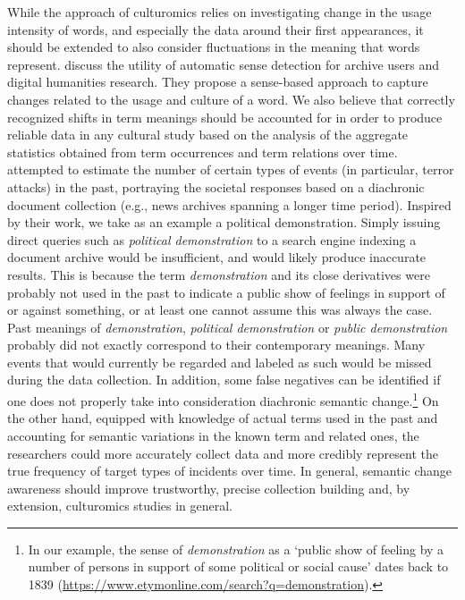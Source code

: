 \documentclass[output=paper%
]{langsci/langscibook}
\begin{document}
While the approach of culturomics relies on investigating change in the usage intensity of words, and especially the data around their first appearances, it should be extended to also consider fluctuations in the meaning that words represent. \citet{tahmasebi2017uses} discuss the utility of automatic sense detection for archive users and  digital humanities research. They propose a sense-based approach to capture changes related to the usage and culture of a word. We also believe that correctly recognized shifts in term meanings should be accounted for in order to produce reliable data in any cultural study based on the analysis of the aggregate statistics obtained from term occurrences and term relations over time. \citet{dblp:conf/histoinfo/fridlundobb19} attempted to estimate the number of certain types of events (in particular, terror attacks) in the past,  portraying the societal responses based on a diachronic document collection (e.g., news archives spanning a longer time period). Inspired by their work, we take as an example a political demonstration.
Simply issuing direct queries such as \emph{political demonstration} to a search engine indexing a document archive would be insufficient, and would likely produce inaccurate results. This is because the term \emph{demonstration} and its close derivatives were probably not used in the past to indicate a public show of feelings in support of or against something, or at least one cannot assume this was always the case. Past meanings of \emph{demonstration}, \emph{political demonstration} or \emph{public demonstration} probably did not exactly correspond to their contemporary meanings. Many events that would currently be regarded and labeled as such would  be missed during the data collection. In addition, some false negatives can  be identified if one does not properly take into consideration diachronic semantic change.\footnote{In our example, the sense of \emph{demonstration} as a `public show of feeling by a number of persons in support of some political or social cause' dates back to 1839 (\url{https://www.etymonline.com/search?q=demonstration}).} On the other hand, equipped with  knowledge of actual terms used in the past and accounting for semantic variations in the known term and related ones, the researchers could more accurately collect data and more credibly represent the true frequency of target types of incidents over time. In general, semantic change awareness should improve trustworthy, precise collection building and, by extension, culturomics studies in general. 
\end{document}
